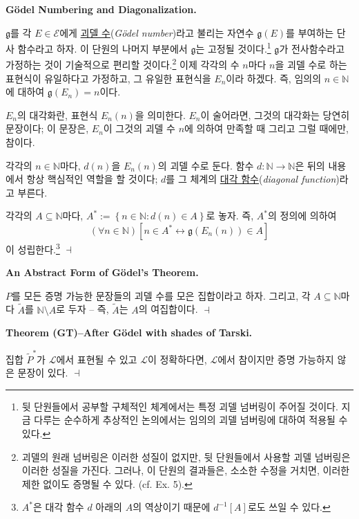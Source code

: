 \documentclass[12pt]{paper}
\newcommand{\gnum}
{ \mathfrak{g}
}
\newenvironment{context}[1][]
{ \noindent \textbf{{#1}.}
}
{ \hfill $ \dashv $
}
\begin{document}
  \begin{context}[G\"odel Numbering and Diagonalization]
    $\gnum$를 각 $E \in \mathcal{E}$에게 \underline{괴델 수}(\textit{G\"odel number})라고 불리는 자연수 $\gnum \left( E \right)$를 부여하는 단사 함수라고 하자.
    이 단원의 나머지 부분에서 $\gnum$는 고정될 것이다.\footnote
    {
      뒷 단원들에서 공부할 구체적인 체계에서는 특정 괴델 넘버링이 주어질 것이다.
      지금 다루는 순수하게 추상적인 논의에서는 임의의 괴델 넘버링에 대하여 적용될 수 있다.
    }
    $\gnum$가 전사함수라고 가정하는 것이 기술적으로 편리할 것이다.\footnote
    {
      괴델의 원래 넘버링은 이러한 성질이 없지만,
      뒷 단원들에서 사용할 괴델 넘버링은 이러한 성질을 가진다.
      그러나, 이 단원의 결과들은, 소소한 수정을 거치면,
      이러한 제한 없이도 증명될 수 있다.
      (cf. Ex. 5).
    }
    이제 각각의 수 $n$마다 $n$을 괴델 수로 하는 표현식이 유일하다고 가정하고,
    그 유일한 표현식을 $E_{n}$이라 하겠다.
    즉, 임의의 $n \in \mathbb{N}$에 대하여 $\gnum \left( E_{n} \right) = n$이다.

    $E_{n}$의 대각화란, 표현식 $E_{n} \left( n \right)$을 의미한다.
    $E_{n}$이 술어라면, 그것의 대각화는 당연히 문장이다;
    이 문장은, $E_{n}$이 그것의 괴델 수 $n$에 의하여 만족할 때 그리고 그럴 때에만, 참이다.

    각각의 $n \in \mathbb{N}$마다, $d \left( n \right)$을 $E_{n} \left( n \right)$의 괴델 수로 둔다.
    함수 $d : \mathbb{N} \to \mathbb{N}$은 뒤의 내용에서 항상 핵심적인 역할을 할 것이다;
    $d$를 그 체계의 \underline{대각 함수}(\textit{diagonal function})라고 부른다.

    각각의 $A \subseteq \mathbb{N}$마다, $A^{*} := \left\{ n \in \mathbb{N} : d \left( n \right) \in A \right\} $로 놓자.
    즉, $A^{*}$의 정의에 의하여 $$ \left( \forall n \in \mathbb{N} \right) \left[ n \in A^{*} \leftrightarrow \gnum \left( E_{n} \left( n \right) \right) \in A \right] $$이 성립한다.\footnote
    {
      $A^{*}$은 대각 함수 $d$ 아래의 $A$의 역상이기 때문에 $d^{-1} \left[ A \right]$로도 쓰일 수 있다.
    }
  \end{context}

  \begin{context}[An Abstract Form of G\"odel's Theorem]
    $P$를 모든 증명 가능한 문장들의 괴델 수를 모은 집합이라고 하자.
    그리고, 각 $A \subseteq \mathbb{N}$마다 $\tilde{A}$를 $\mathbb{N} \setminus A$로 두자 --
    즉, $\tilde{A}$는 $A$의 여집합이다.
  \end{context}

  \begin{context}[Theorem (GT)--After G\"odel with shades of Tarski]
    집합 $\tilde{P}^{*}$가 $\mathcal{L}$에서 표현될 수 있고 $\mathcal{L}$이 정확하다면,
    $\mathcal{L}$에서 참이지만 증명 가능하지 않은 문장이 있다.
  \end{context}
\end{document}
